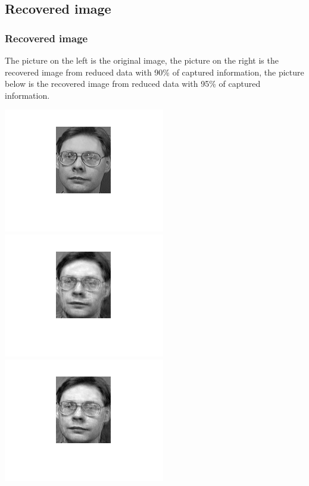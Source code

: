 \documentclass[10pt]{beamer}
\begin{document}
\subsection{Recovered image}
\begin{frame}
    \frametitle{Recovered image}
    The picture on the left is the original image, the picture on the right is the recovered image from reduced data with 90\% of captured information, the picture below is the recovered image from reduced data with 95\% of captured information.

    \begin{center}
        \includegraphics[scale=0.7]{original_image}
        \includegraphics[scale=0.7]{recovered_0.9}    
        \includegraphics[scale=0.7]{recovered_0.95}
    \end{center}
    
\end{frame}
\end{document}
